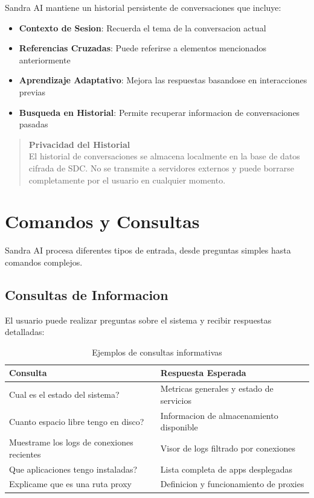 Sandra AI mantiene un historial persistente de conversaciones que incluye:

\begin{itemize}[leftmargin=*]
    \item \textbf{Contexto de Sesion}: Recuerda el tema de la conversacion actual
    \item \textbf{Referencias Cruzadas}: Puede referirse a elementos mencionados anteriormente
    \item \textbf{Aprendizaje Adaptativo}: Mejora las respuestas basandose en interacciones previas
    \item \textbf{Busqueda en Historial}: Permite recuperar informacion de conversaciones pasadas
\end{itemize}

\begin{quote}
\textbf{Privacidad del Historial}\\
El historial de conversaciones se almacena localmente en la base de datos cifrada de SDC. No se transmite a servidores externos y puede borrarse completamente por el usuario en cualquier momento.
\end{quote}

\section{Comandos y Consultas}
\label{sec:comandos-chat}

Sandra AI procesa diferentes tipos de entrada, desde preguntas simples hasta comandos complejos.

\subsection{Consultas de Informacion}

El usuario puede realizar preguntas sobre el sistema y recibir respuestas detalladas:

\begin{table}[H]
\centering
\begin{tabular}{p{8cm}p{6cm}}
\toprule
\textbf{Consulta} & \textbf{Respuesta Esperada} \\
\midrule
Cual es el estado del sistema? & Metricas generales y estado de servicios \\
\midrule
Cuanto espacio libre tengo en disco? & Informacion de almacenamiento disponible \\
\midrule
Muestrame los logs de conexiones recientes & Visor de logs filtrado por conexiones \\
\midrule
Que aplicaciones tengo instaladas? & Lista completa de apps desplegadas \\
\midrule
Explicame que es una ruta proxy & Definicion y funcionamiento de proxies \\
\bottomrule
\end{tabular}
\caption{Ejemplos de consultas informativas}
\label{tab:consultas-chat}
\end{table}


